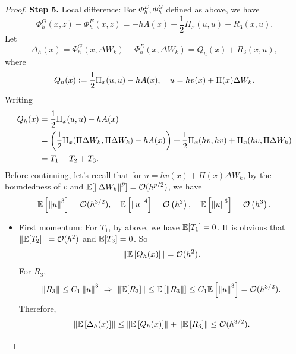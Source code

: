 \begin{proof}
    \vspace{0.5em}
    \textbf{Step 5.} Local difference: For $\Phi^E_h, \Phi^G_h$ defined as above, we have
    \begin{equation*}
        \Phi_h^G(x, z)-\Phi_h^E(x, z) = -hA(x) + \frac{1}{2}\Pi_x(u,u) + R_3(x,u).
    \end{equation*}
    Let
    \begin{equation*}
        \Delta_h(x) = \Phi_h^G(x, \Delta W_k)-\Phi_h^E(x, \Delta W_k) = Q_h(x) + R_3(x,u),
    \end{equation*}
    where
    \begin{equation*}
        Q_h(x) \vcentcolon= \frac{1}{2}\Pi_x(u,u) - hA(x),\quad u = hv(x) + \Pi(x)\Delta W_k.
    \end{equation*}
    Writing
    \begin{align*}
        Q_h(x) & =\frac{1}{2} \mathrm{II}_x(u, u)-h A(x) \\
        & =\left(\frac{1}{2} \mathrm{II}_x(\Pi \Delta W_k, \Pi \Delta W_k)-h A(x)\right)+\frac{1}{2} \mathrm{II}_x(h v, h v)+\mathrm{II}_x(h v, \Pi \Delta W_k) \\
        & = T_1 + T_2 + T_3.
    \end{align*}
    Before continuing, let's recall that for $u = hv(x) + \Pi(x)\Delta W_k$, by the boundedness of $v$ and $\mathbb{E}[\left\lVert\Delta W_k\right\lVert^p] = \mathcal{O}(h^{p/2})$, we have
    \begin{equation*}
        \mathbb{E}\left[\left\lVert u\right\lVert^3\right]=\mathcal{O}(h^{3/2}), \quad \mathbb{E}\left[\left\lVert u\right\lVert^4\right]=\mathcal{O}\left(h^2\right), \quad \mathbb{E}\left[\left\lVert u\right\lVert^6\right]=\mathcal{O}\left(h^3\right) .
    \end{equation*}
    \begin{itemize}
        \item First momentum: For $T_1$, by above, we have $\mathbb{E}[T_1] = 0$. It is obvious that $\left\lVert\mathbb{E}[T_2]\right\lVert = \mathcal{O}(h^2)$ and $\mathbb{E}[T_3] = 0$. So 
        \begin{equation*}
            \left\lVert\mathbb{E}\left[Q_h(x)\right]\right\lVert = \mathcal{O}(h^2).
        \end{equation*}
        For $R_3$,
        \begin{equation*}
            \left\lVert R_3\right\lVert \leq C_1\left\lVert u\right\lVert^3~\Rightarrow~ \left\lVert\mathbb{E}[R_3]\right\lVert \leq \mathbb{E}\left[\left\lVert R_3\right\lVert\right] \leq C_1 \mathbb{E}\left[\left\lVert u\right\lVert^3\right] = \mathcal{O}(h^{3/2}).
        \end{equation*}
        Therefore,
        \begin{equation*}
            \left\lVert\mathbb{E}\left[\Delta_h(x)\right]\right\lVert \leq  \left\lVert\mathbb{E}\left[Q_h(x)\right]\right\lVert + \left\lVert\mathbb{E}\left[R_3\right]\right\lVert \leq \mathcal{O}(h^{3/2}).
        \end{equation*}


\end{itemize}
\end{proof}
